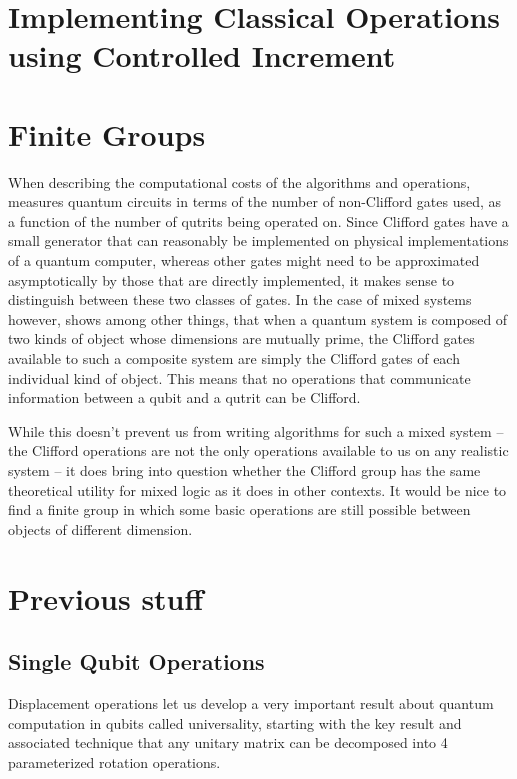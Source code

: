 \documentclass[]{article}
\begin{document}
\section{Implementing Classical Operations using Controlled Increment}

\section{Finite Groups}
When describing the computational costs of the algorithms and operations, \cite{arithmetics} measures quantum circuits in terms of the number of non-Clifford gates used, as a function of the number of qutrits being operated on. Since Clifford gates have a small generator that can reasonably be implemented on physical implementations of a quantum computer, whereas other gates might need to be approximated asymptotically by those that are directly implemented, it makes sense to distinguish between these two classes of gates. In the case of mixed systems however, \cite{tolar-clifford} shows among other things, that when a quantum system is composed of two kinds of object whose dimensions are mutually prime, the Clifford gates available to such a composite system are simply the Clifford gates of each individual kind of object. This means that no operations that communicate information between a qubit and a qutrit can be Clifford.

While this doesn't prevent us from writing algorithms for such a mixed system -- the Clifford operations are not the only operations available to us on any realistic system -- it does bring into question whether the Clifford group has the same theoretical utility for mixed logic as it does in other contexts. It would be nice to find a finite group in which some basic operations are still possible between objects of different dimension.


\section{Previous stuff}
\subsection{Single Qubit Operations}

Displacement operations let us develop a very important result about quantum computation in qubits called universality, starting with the key result and associated technique that any unitary matrix can be decomposed into 4 parameterized rotation operations.
\end{document}
